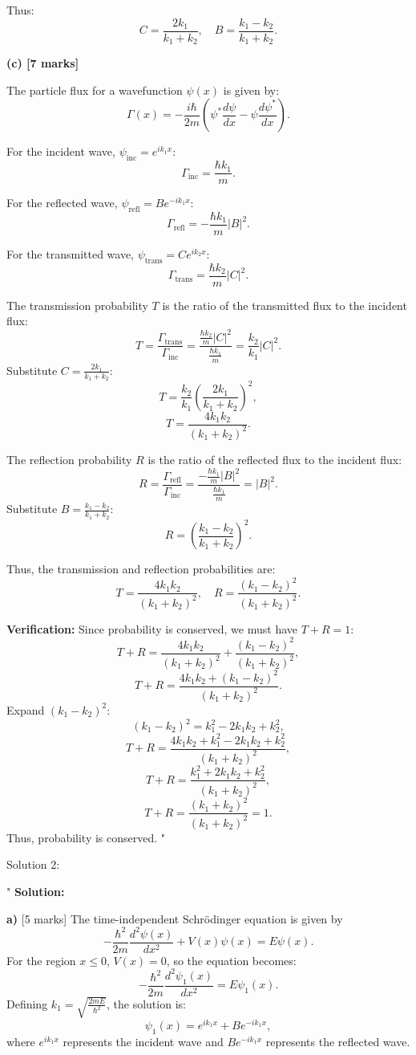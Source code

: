 Thus:
\[
C = \frac{2k_1}{k_1 + k_2}, \quad B = \frac{k_1 - k_2}{k_1 + k_2}.
\]

\textbf{(c) [7 marks]}

The particle flux for a wavefunction $\psi(x)$ is given by:
\[
\Gamma(x) = -\frac{i\hbar}{2m} \left( \psi^* \frac{d\psi}{dx} - \psi \frac{d\psi^*}{dx} \right).
\]

For the incident wave, $\psi_\text{inc} = e^{ik_1x}$:
\[
\Gamma_\text{inc} = \frac{\hbar k_1}{m}.
\]

For the reflected wave, $\psi_\text{refl} = Be^{-ik_1x}$:
\[
\Gamma_\text{refl} = -\frac{\hbar k_1}{m} |B|^2.
\]

For the transmitted wave, $\psi_\text{trans} = Ce^{ik_2x}$:
\[
\Gamma_\text{trans} = \frac{\hbar k_2}{m} |C|^2.
\]

The transmission probability $T$ is the ratio of the transmitted flux to the incident flux:
\[
T = \frac{\Gamma_\text{trans}}{\Gamma_\text{inc}} = \frac{\frac{\hbar k_2}{m} |C|^2}{\frac{\hbar k_1}{m}} = \frac{k_2}{k_1} |C|^2.
\]
Substitute $C = \frac{2k_1}{k_1 + k_2}$:
\[
T = \frac{k_2}{k_1} \left(\frac{2k_1}{k_1 + k_2}\right)^2,
\]
\[
T = \frac{4k_1k_2}{(k_1 + k_2)^2}.
\]

The reflection probability $R$ is the ratio of the reflected flux to the incident flux:
\[
R = \frac{\Gamma_\text{refl}}{\Gamma_\text{inc}} = \frac{-\frac{\hbar k_1}{m} |B|^2}{\frac{\hbar k_1}{m}} = |B|^2.
\]
Substitute $B = \frac{k_1 - k_2}{k_1 + k_2}$:
\[
R = \left(\frac{k_1 - k_2}{k_1 + k_2}\right)^2.
\]

Thus, the transmission and reflection probabilities are:
\[
T = \frac{4k_1k_2}{(k_1 + k_2)^2}, \quad R = \frac{(k_1 - k_2)^2}{(k_1 + k_2)^2}.
\]

\textbf{Verification:} Since probability is conserved, we must have $T + R = 1$:
\[
T + R = \frac{4k_1k_2}{(k_1 + k_2)^2} + \frac{(k_1 - k_2)^2}{(k_1 + k_2)^2},
\]
\[
T + R = \frac{4k_1k_2 + (k_1 - k_2)^2}{(k_1 + k_2)^2}.
\]
Expand $(k_1 - k_2)^2$:
\[
(k_1 - k_2)^2 = k_1^2 - 2k_1k_2 + k_2^2,
\]
\[
T + R = \frac{4k_1k_2 + k_1^2 - 2k_1k_2 + k_2^2}{(k_1 + k_2)^2},
\]
\[
T + R = \frac{k_1^2 + 2k_1k_2 + k_2^2}{(k_1 + k_2)^2},
\]
\[
T + R = \frac{(k_1 + k_2)^2}{(k_1 + k_2)^2} = 1.
\]
Thus, probability is conserved.
"

Solution 2: 

"
\textbf{Solution:}

\textbf{a)} [5 marks]  
The time-independent Schrödinger equation is given by  
\[
-\frac{\hbar^2}{2m} \frac{d^2 \psi(x)}{dx^2} + V(x)\psi(x) = E\psi(x).
\]  
For the region $x \leq 0$, $V(x) = 0$, so the equation becomes:  
\[
-\frac{\hbar^2}{2m} \frac{d^2 \psi_1(x)}{dx^2} = E\psi_1(x).
\]  
Defining $k_1 = \sqrt{\frac{2mE}{\hbar^2}}$, the solution is:  
\[
\psi_1(x) = e^{ik_1x} + Be^{-ik_1x},
\]  
where $e^{ik_1x}$ represents the incident wave and $Be^{-ik_1x}$ represents the reflected wave.  

